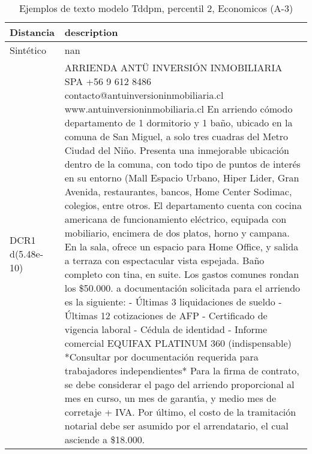 \begin{table}[H]
\centering
\fontsize{10}{14}\selectfont
\caption{Ejemplos de texto modelo Tddpm, percentil 2, Economicos (A-3)}
\label{table-example-economicos-a-3-tddpm_mlp-2p-text}
\begin{tabular}{|l|m{35em}|}
\hline
\rowcolor[gray]{0.8}
Distancia & description \\
\hline Sintético & nan \\
\hline DCR1 d(5.48e-10) & ARRIENDA ANT\"U INVERSI\'ON INMOBILIARIA SPA +56 9 612 8486 contacto@antuinversioninmobiliaria.cl www.antuinversioninmobiliaria.cl  En arriendo c\'omodo departamento de 1 dormitorio y 1 ba\~no, ubicado en la comuna de San Miguel, a solo tres cuadras del Metro Ciudad del Ni\~no. Presenta una inmejorable ubicaci\'on dentro de la comuna, con todo tipo de puntos de inter\'es en su entorno (Mall Espacio Urbano, Hiper Lider, Gran Avenida, restaurantes, bancos, Home Center Sodimac, colegios, entre otros.  El departamento cuenta con cocina americana de funcionamiento el\'ectrico, equipada con mobiliario, encimera de dos platos, horno y campana. En la sala, ofrece un espacio para Home Office, y salida a terraza con espectacular vista espejada. Ba\~no completo con tina, en suite. Los gastos comunes rondan los \$50.000.  a documentaci\'on solicitada para el arriendo es la siguiente:  - \'Ultimas 3 liquidaciones de sueldo - \'Ultimas 12 cotizaciones de AFP - Certificado de vigencia laboral - C\'edula de identidad - Informe comercial EQUIFAX PLATINUM 360 (indispensable)  *Consultar por documentaci\'on requerida para trabajadores independientes*  Para la firma de contrato, se debe considerar el pago del arriendo proporcional al mes en curso, un mes de garant{\'\i}a, y medio mes de corretaje + IVA. Por \'ultimo, el costo de la tramitaci\'on notarial debe ser asumido por el arrendatario, el cual asciende a \$18.000. \\

\end{tabular}
\end{table}
